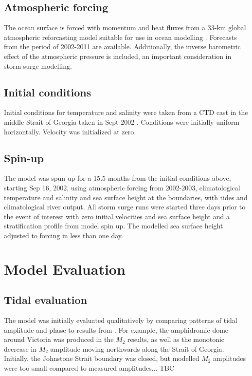 \documentclass[pdftex,10pt]{article}
\begin{document}
\subsection{Atmospheric forcing}
The ocean surface is forced with momentum and heat fluxes from a 33-km global atmospheric reforcasting model suitable for use in ocean modelling \citep{smith2013new}. Forecasts from the period of 2002-2011 are available. Additionally, the inverse barometric effect of the atmospheric pressure is included, an important consideration in storm surge modelling. 

\subsection{Initial conditions}
Initial conditions for temperature and salinity were taken from a CTD cast in the middle Strait of Georgia taken in Sept 2002 \citep{pawlowiczetal2007}.  Conditions were initially uniform horizontally.  Velocity was initialized at zero. 

\subsection{Spin-up}
The model was spun up for a 15.5 months from the initial conditions above, starting Sep 16, 2002, using atmospheric forcing from 2002-2003, climatological temperature and salinity and sea surface height at the boundaries, with tides and climatological river output.  All storm surge runs were started three days prior to the event of interest with zero initial velocities and sea surface height and a stratification profile from model spin up. The modelled sea surface height adjusted to forcing in less than one day. 

\section{Model Evaluation}\label{sec:model}

\subsection{Tidal evaluation}
The model was initially evaluated qualitatively by comparing patterns of tidal amplitude and phase to results from \citep{foreman1995tidal}. For example, the amphidromic dome around Victoria was produced in the $M_2$ results, as well as the monotonic decrease in $M_2$ amplitude moving northwards along the Strait of Georgia. Initially, the Johnstone Strait boundary was closed, but modelled $M_2$ amplitudes were too small compared to measured amplitudes... TBC
\end{document}

